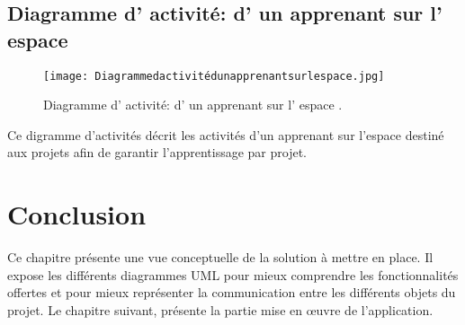 \subsection{Diagramme d' activité: d' un apprenant sur l' espace}


\begin{figure}[ht]
	\centering
	\texttt{[image: Diagrammedactivitédunapprenantsurlespace.jpg]}
	\caption{Diagramme d' activité: d' un apprenant sur l' espace .}
	\label{fig:Diagramme d' activité: d' un apprenant sur l' espace }
\end{figure}
\FloatBarrier

Ce digramme d’activités décrit les activités d’un apprenant sur l’espace destiné aux projets
afin de garantir l’apprentissage par projet.






\section{Conclusion}

Ce chapitre présente une vue conceptuelle de la solution à mettre en place. Il expose les différents diagrammes UML pour mieux comprendre les fonctionnalités offertes et pour mieux représenter la communication entre les différents objets du projet. Le chapitre suivant, présente la partie mise en œuvre de l’application.


